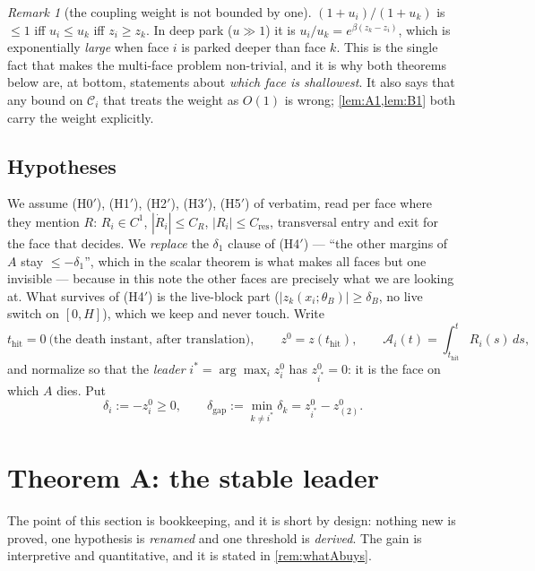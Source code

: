 \documentclass[11pt]{article}
\theoremstyle{remark}
\newtheorem{remark}[theorem]{Remark}
\newcommand{\thit}{t_{\mathrm{hit}}}
\newcommand{\Ar}{\mathcal{A}}
\newcommand{\Cres}{C_{\mathrm{res}}}
\newcommand{\dgap}{\delta_{\mathrm{gap}}}
\newcommand{\hyplabel}[1]{\textup{(#1)}}
\begin{document}
\begin{remark}[the coupling weight is not bounded by one]\label{rem:weight}
$(1+u_i)/(1+u_k)$ is $\le1$ iff $u_i\le u_k$ iff $z_i\ge z_k$. In deep park
($u\gg1$) it is $u_i/u_k=e^{\beta(z_k-z_i)}$, which is exponentially
\emph{large} when face $i$ is parked deeper than face $k$. This is the single
fact that makes the multi-face problem non-trivial, and it is why both theorems
below are, at bottom, statements about \emph{which face is shallowest}. It also
says that any bound on $\mathcal C_i$ that treats the weight as $O(1)$ is wrong;
\cref{lem:A1,lem:B1} both carry the weight explicitly.
\end{remark}

\subsection{Hypotheses}

We assume \hyplabel{H0$'$}, \hyplabel{H1$'$}, \hyplabel{H2$'$},
\hyplabel{H3$'$}, \hyplabel{H5$'$} of \cite[\S3.1]{paper} verbatim, read
per face where they mention $R$: $R_i\in C^1$, $|\dot R_i|\le C_R$,
$|R_i|\le\Cres$, transversal entry and exit for the face that decides. We
\emph{replace} the $\delta_1$ clause of \hyplabel{H4$'$} --- ``the other margins
of $A$ stay $\le-\delta_1$'', which in the scalar theorem is what makes all
faces but one invisible --- because in this note the other faces are precisely
what we are looking at. What survives of \hyplabel{H4$'$} is the live-block part
($|z_k(x_i;\theta_B)|\ge\delta_B$, no live switch on $[0,H]$), which we keep and
never touch. Write
\[
\thit=0\ \text{(the death instant, after translation)},\qquad
z^0=z(\thit),\qquad \Ar_i(t)=\int_{\thit}^{t}R_i(s)\,ds ,
\]
and normalize so that the \emph{leader} $i^\ast=\arg\max_iz_i^0$ has
$z^0_{i^\ast}=0$: it is the face on which $A$ dies. Put
\begin{equation}\label{eq:gapdef}
\delta_i:=-z_i^0\ge0,\qquad
\dgap:=\min_{k\ne i^\ast}\delta_k=z^0_{i^\ast}-z^0_{(2)} .
\end{equation}

\section{Theorem A: the stable leader}\label{sec:A}

The point of this section is bookkeeping, and it is short by design: nothing new
is proved, one hypothesis is \emph{renamed} and one threshold is \emph{derived}.
The gain is interpretive and quantitative, and it is stated in
\cref{rem:whatAbuys}.
\end{document}
